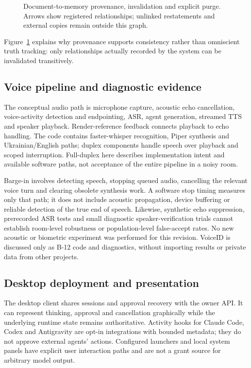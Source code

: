 \documentclass[11pt,a4paper]{article}
\begin{document}
\begin{figure}[tbp]\centering
\caption{Document-to-memory provenance, invalidation and explicit purge. Arrows show registered relationships; unlinked restatements and external copies remain outside this graph.}\label{fig:provenance}\end{figure}
Figure~\ref{fig:provenance} explains why provenance supports consistency rather than omniscient truth tracking: only relationships actually recorded by the system can be invalidated transitively.

\subsection{Voice pipeline and diagnostic evidence}
The conceptual audio path is microphone capture, acoustic echo cancellation, voice-activity detection and endpointing, ASR, agent generation, streamed TTS and speaker playback. Render-reference feedback connects playback to echo handling. The code contains faster-whisper recognition, Piper synthesis and Ukrainian/English paths; duplex components handle speech over playback and scoped interruption. Full-duplex here describes implementation intent and available software paths, not acceptance of the entire pipeline in a noisy room.

Barge-in involves detecting speech, stopping queued audio, cancelling the relevant voice turn and clearing obsolete synthesis work. A software stop timing measures only that path; it does not include acoustic propagation, device buffering or reliable detection of the true end of speech. Likewise, synthetic echo suppression, prerecorded ASR tests and small diagnostic speaker-verification trials cannot establish room-level robustness or population-level false-accept rates. No new acoustic or biometric experiment was performed for this revision. VoiceID is discussed only as B-12 code and diagnostics, without importing results or private data from other projects.

\subsection{Desktop deployment and presentation}
The desktop client shares sessions and approval recovery with the owner API. It can represent thinking, approval and cancellation graphically while the underlying runtime state remains authoritative. Activity hooks for Claude Code, Codex and Antigravity are opt-in integrations with bounded metadata; they do not approve external agents' actions. Configured launchers and local system panels have explicit user interaction paths and are not a grant source for arbitrary model output.
\end{document}
